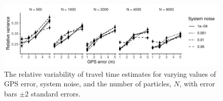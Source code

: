 \begin{figure}[tb]
    \centering
    \includegraphics[width=\textwidth]{figures/04_model_results_times.pdf}
    \caption{
        The relative variability of travel time estimates for varying
        values of GPS error, system noise, and the number of particles, $N$,
        with error bars $\pm 2$ standard errors.
    }
    \label{fig:travel_times}
\end{figure}



